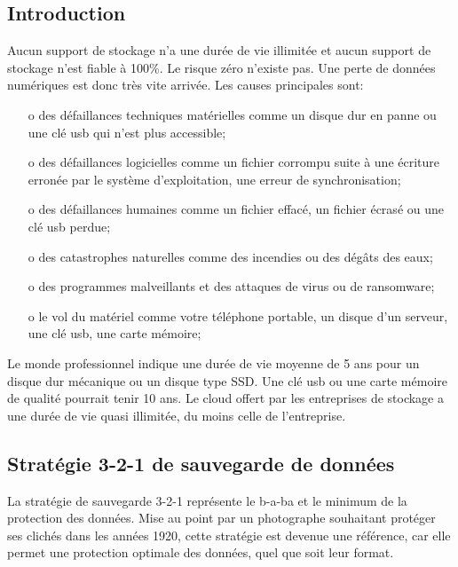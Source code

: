 \documentclass[11pt, a4paper]{book}
\begin{document}
\subsection{Introduction}
Aucun support de stockage n’a une durée de vie illimitée et aucun support de stockage n’est fiable à 100\%. Le risque zéro n’existe pas. Une perte de données numériques est donc très vite arrivée. Les causes principales sont:
\begin{enumerate}
\item[o] des défaillances techniques matérielles comme un disque dur en panne ou une clé usb qui n’est plus accessible;
\item[o] des défaillances logicielles comme un fichier corrompu suite à une écriture erronée par le système d’exploitation, une erreur de synchronisation;
\item[o] des défaillances humaines comme un fichier effacé, un fichier écrasé ou une clé usb perdue;
\item[o] des catastrophes naturelles comme des incendies ou des dégâts des eaux;
\item[o] des programmes malveillants et des attaques de virus ou de ransomware;
\item[o] le vol du matériel comme votre téléphone portable, un disque d’un serveur, une clé usb, une carte mémoire;
\end{enumerate}
Le monde professionnel indique une durée de vie moyenne de 5 ans pour un disque dur mécanique ou un disque type SSD. Une clé usb ou une carte mémoire de qualité pourrait tenir 10 ans. Le cloud offert par les entreprises de stockage a une durée de vie quasi illimitée, du moins celle de l’entreprise.

\subsection{Stratégie 3-2-1 de sauvegarde de données}

La stratégie de sauvegarde 3-2-1 représente le b-a-ba et le minimum de la protection des données. Mise au point par un photographe souhaitant protéger ses clichés dans les années 1920, cette stratégie est devenue une référence, car elle permet une protection optimale des données, quel que soit leur format.
\end{document}

